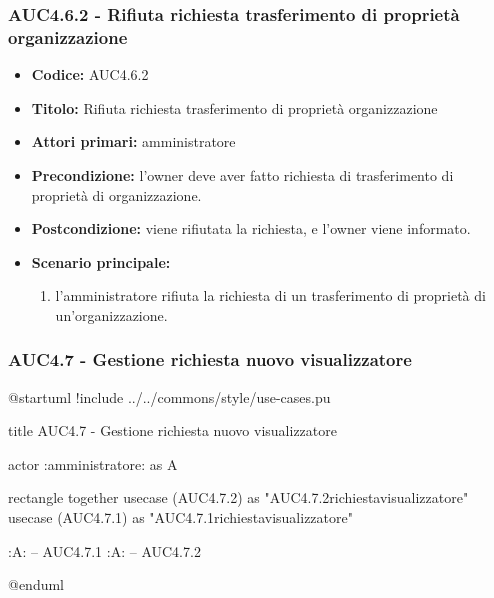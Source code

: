 \documentclass[casi-duso]{subfiles}
\begin{document}
\subsubsection{AUC4.6.2 - Rifiuta richiesta trasferimento di proprietà organizzazione}%
\label{subsub:AUC4.6.2}
\begin{itemize}
  \item \textbf{Codice:} AUC4.6.2
  \item \textbf{Titolo:} Rifiuta richiesta trasferimento di proprietà organizzazione
  \item \textbf{Attori primari:} amministratore
  \item \textbf{Precondizione:} l'owner deve aver fatto richiesta di trasferimento di proprietà di organizzazione.
  \item \textbf{Postcondizione:} viene rifiutata la richiesta, e l'owner viene informato.
  \item \textbf{Scenario principale:}
  \begin{enumerate}
    \item  l'amministratore rifiuta la richiesta di un trasferimento di proprietà di un'organizzazione.
  \end{enumerate}
\end{itemize}

\subsubsection{AUC4.7 - Gestione richiesta nuovo visualizzatore}%
\label{subsub:AUC4.7}

\begin{plantuml}
@startuml
!include ../../commons/style/use-cases.pu

title AUC4.7 - Gestione richiesta nuovo visualizzatore

actor :amministratore: as A

rectangle {
  together {
    usecase (AUC4.7.2) as "AUC4.7.2\nRifiuta richiesta\nnuovo visualizzatore"
    usecase (AUC4.7.1) as "AUC4.7.1\nAccetta richiesta\nnuovo visualizzatore"
  }
}

:A: -- AUC4.7.1
:A: -- AUC4.7.2

@enduml
\end{plantuml}
\end{document}
